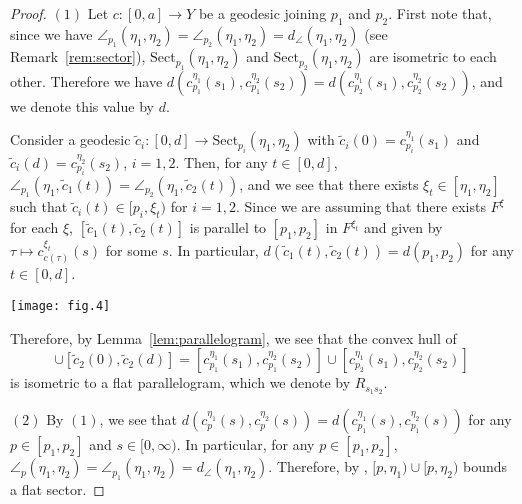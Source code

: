 \documentclass[12pt]{amsart}
\numberwithin{equation}{section}
\theoremstyle{plain}
\theoremstyle{definition}
\theoremstyle{remark}
\newcommand{\ray}[1]{[#1)}
\newcommand{\cc}[2]{c_{#1}^{#2}}
\newcommand{\sect}[3][]{\mathrm{Sect}_{#1}(#2,#3)}
\begin{document}
\begin{proof}
 $(1)$ Let $c\colon [0,a]\rightarrow Y$ be a geodesic joining $p_1$ and
 $p_2$. 
 First note that, since we have
 $\angle_{p_1}(\eta_1,\eta_2)=\angle_{p_2}(\eta_1,\eta_2)=d_{\angle}(\eta_1,\eta_2)$
 (see Remark~\ref{rem:sector}),
 $\sect[p_1]{\eta_1}{\eta_2}$ and $\sect[p_2]{\eta_1}{\eta_2}$ are
 isometric to each other. 
 Therefore we have
 $d(\cc{p_1}{\eta_1}(s_1),\cc{p_1}{\eta_2}(s_2))=
  d(\cc{p_2}{\eta_1}(s_1),\cc{p_2}{\eta_2}(s_2))$, 
 and we denote this value by $d$. 

\noindent
\begin{minipage}[c]{6.5cm}
 Consider a geodesic 
 $\tilde c_i \colon [0,d]\rightarrow \sect[p_i]{\eta_1}{\eta_2}$ 
 with $\tilde c_i(0)=c_{p_i}^{\eta_1}(s_1)$ and 
 $\tilde c_i(d)=c_{p_i}^{\eta_2}(s_2)$,
 $i=1,2$. Then, for any $t \in [0,d]$, 
 $\angle_{p_1}(\eta_1, \tilde c_1(t))= \angle_{p_2}(\eta_1, \tilde
 c_2(t))$,  
 and we see that there exists $\xi_t\in [\eta_1,\eta_2]$ such that 
 $\tilde c_i(t) \in [p_i,\xi_t)$ for $i=1,2$. 
 Since we are assuming that there exists $F^{\xi}$ for each $\xi$, 
 $[\tilde c_1(t), \tilde c_2(t)]$ is parallel to
 $[p_1,p_2]$ in $F^{\xi_t}$ 
 and given by
 $\tau \mapsto \cc{c(\tau)}{\xi_t}(s)$ for some $s$. 
 In particular, 
 $d(\tilde c_1(t),\tilde c_2(t))=d(p_1,p_2)$
 for any $t \in [0,d]$. 
\end{minipage} 
\begin{minipage}[c]{6cm}
\hspace{1cm}
\vspace{0.5cm} \hspace{4cm}
\texttt{[image: fig.4]}
\end{minipage}

\vspace{0.5cm}
\noindent
 Therefore, by Lemma~\ref{lem:parallelogram}, we see that 
 the convex hull of 
\begin{equation*}
  [\tilde c_1(0),\tilde c_1(d)] \cup  [\tilde c_2(0),\tilde c_2(d)] 
 =[\cc{p_1}{\eta_1}(s_1),\cc{p_1}{\eta_2}(s_2)] \cup
  [\cc{p_2}{\eta_1}(s_1),\cc{p_2}{\eta_2}(s_2)]
\end{equation*} 
 is isometric to a flat parallelogram, which we denote by $R_{s_1s_2}$.

 $(2)$  By $(1)$, we see that 
 $d(\cc{p}{\eta_1}(s),\cc{p}{\eta_2}(s))=
 d(\cc{p_1}{\eta_1}(s),\cc{p_1}{\eta_2}(s))$
 for any $p \in [p_1,p_2]$ and $s \in [0,\infty)$. 
 In particular, for any $p \in [p_1,p_2]$, 
 $\angle_p(\eta_1, \eta_2)=\angle_{p_1}(\eta_1,\eta_2)=
 d_{\angle}(\eta_1,\eta_2)$. 
 Therefore, by \cite[p.~283, 9.9 Corollary]{bridson-haefliger}, 
 $\ray{p,\eta_1} \cup \ray{p,\eta_2}$ bounds a flat sector. 


\end{proof}
\end{document}
